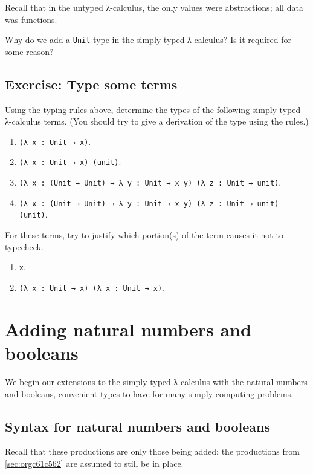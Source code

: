 \documentclass[11pt]{article}
\theoremstyle{definition}
\begin{document}
Recall that in the untyped λ-calculus,
the only values were abstractions; all data was functions.

Why do we add a \texttt{Unit} type in the simply-typed λ-calculus?
Is it required for some reason?

\subsection{Exercise: Type some terms}
\label{sec:org2681edc}

Using the typing rules above, determine the types of the following
simply-typed λ-calculus terms.
(You should try to give a derivation of the type using the rules.)

\begin{enumerate}
\item \texttt{(λ x : Unit → x)}.
\item \texttt{(λ x : Unit → x) (unit)}.
\item \texttt{(λ x : (Unit → Unit) → λ y : Unit → x y) (λ z : Unit → unit)}.
\item \texttt{(λ x : (Unit → Unit) → λ y : Unit → x y) (λ z : Unit → unit) (unit)}.
\end{enumerate}

For these terms, try to justify which portion(s) of the term
causes it not to typecheck.
\begin{enumerate}
\item \texttt{x}.
\item \texttt{(λ x : Unit → x) (λ x : Unit → x)}.
\end{enumerate}

\section{Adding natural numbers and booleans}
\label{sec:org1a7da2a}

We begin our extensions to the simply-typed λ-calculus
with the natural numbers and booleans,
convenient types to have for many simply computing problems.

\subsection{Syntax for natural numbers and booleans}
\label{sec:orgaba9367}

Recall that these productions are only those being added;
the productions from \ref{sec:orgc61c562} are
assumed to still be in place.
\end{document}
